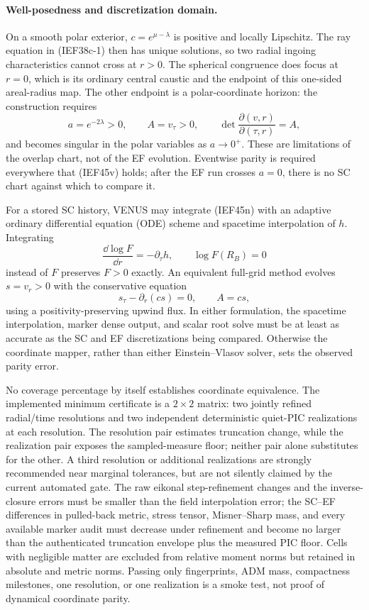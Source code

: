 \paragraph{Well-posedness and discretization domain.}
On a smooth polar exterior, \(c=e^{\mu-\lambda}\) is positive and locally
Lipschitz.  The ray equation in (IEF38c-1) then has unique solutions, so two
radial ingoing characteristics cannot cross at \(r>0\).  The spherical
congruence does focus at \(r=0\), which is its ordinary central caustic and
the endpoint of this one-sided areal-radius map.  The other endpoint is a
polar-coordinate horizon: the construction requires
\[
 a=e^{-2\lambda}>0,\qquad A=v_\tau>0,\qquad
 \det\frac{\partial(v,r)}{\partial(\tau,r)}=A,        \tag{IEF45v}
\]
and becomes singular in the polar variables as \(a\to0^+\).  These are
limitations of the overlap chart, not of the EF evolution.  Eventwise parity
is required everywhere that (IEF45v) holds; after the EF run crosses
\(a=0\), there is no SC chart against which to compare it.

For a stored SC history, VENUS may integrate (IEF45n) with an adaptive
ordinary differential equation (ODE)
scheme and spacetime interpolation of \(h\).  Integrating
\[
 \frac{\dd\log F}{\dd r}=-\partial_\tau h,\qquad
 \log F(R_B)=0                                           \tag{IEF45w}
\]
instead of \(F\) preserves \(F>0\) exactly.  An equivalent full-grid method
evolves \(s=v_r>0\) with the conservative equation
\[
 s_\tau-\partial_r(cs)=0,\qquad A=cs,               \tag{IEF45x}
\]
using a positivity-preserving upwind flux.  In either formulation, the
spacetime interpolation, marker dense output, and scalar root solve must be
at least as accurate as the SC and EF discretizations being compared.
Otherwise the coordinate mapper, rather than either Einstein--Vlasov solver,
sets the observed parity error.

No coverage percentage by itself establishes coordinate equivalence.  The
implemented minimum certificate is a \(2\times2\) matrix: two jointly refined
radial/time resolutions and two independent deterministic quiet-PIC
realizations at each resolution.  The resolution pair estimates truncation
change, while the realization pair exposes the sampled-measure floor; neither
pair alone substitutes for the other.  A third resolution or additional
realizations are strongly recommended near marginal tolerances, but are not
silently claimed by the current automated gate.  The raw eikonal
step-refinement changes and the inverse-closure errors must be smaller than
the field interpolation error;
the SC--EF differences in pulled-back metric, stress tensor,
Misner--Sharp mass, and every available marker audit must decrease under
refinement and become no larger
than the authenticated truncation envelope plus the measured PIC floor.
Cells with negligible matter are excluded from relative moment norms but
retained in absolute and metric norms.  Passing only fingerprints, ADM mass,
compactness milestones, one resolution, or one realization is a smoke test,
not proof of dynamical coordinate parity.

